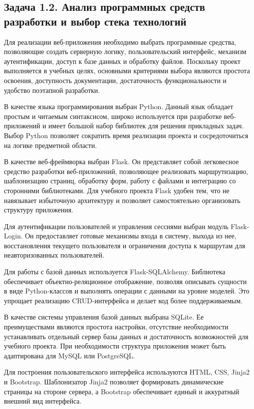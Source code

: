 \documentclass[14pt,a4paper]{extarticle}
\begin{document}
\subsection{Задача 1.2. Анализ программных средств разработки и выбор стека технологий}

Для реализации веб-приложения необходимо выбрать программные средства, позволяющие создать серверную логику, пользовательский интерфейс, механизм аутентификации, доступ к базе данных и обработку файлов. Поскольку проект выполняется в учебных целях, основными критериями выбора являются простота освоения, доступность документации, достаточность функциональности и удобство поэтапной разработки.

В качестве языка программирования выбран Python. Данный язык обладает простым и читаемым синтаксисом, широко используется при разработке веб-приложений и имеет большой набор библиотек для решения прикладных задач. Выбор Python позволяет сократить время реализации проекта и сосредоточиться на логике предметной области.

В качестве веб-фреймворка выбран Flask. Он представляет собой легковесное средство разработки веб-приложений, позволяющее реализовать маршрутизацию, шаблонизацию страниц, обработку форм, работу с файлами и интеграцию со сторонними библиотеками. Для учебного проекта Flask удобен тем, что не навязывает избыточную архитектуру и позволяет самостоятельно организовать структуру приложения.

Для аутентификации пользователей и управления сессиями выбран модуль Flask-Login. Он предоставляет готовые механизмы входа в систему, выхода из нее, восстановления текущего пользователя и ограничения доступа к маршрутам для неавторизованных пользователей.

Для работы с базой данных используется Flask-SQLAlchemy. Библиотека обеспечивает объектно-реляционное отображение, позволяя описывать сущности в виде Python-классов и выполнять операции с данными на уровне моделей. Это упрощает реализацию CRUD-интерфейса и делает код более поддерживаемым.

В качестве системы управления базой данных выбрана SQLite. Ее преимуществами являются простота настройки, отсутствие необходимости устанавливать отдельный сервер базы данных и достаточность возможностей для учебного проекта. При необходимости структура приложения может быть адаптирована для MySQL или PostgreSQL.

Для построения пользовательского интерфейса используются HTML, CSS, Jinja2 и Bootstrap. Шаблонизатор Jinja2 позволяет формировать динамические страницы на стороне сервера, а Bootstrap обеспечивает единый и аккуратный внешний вид интерфейса.
\end{document}
